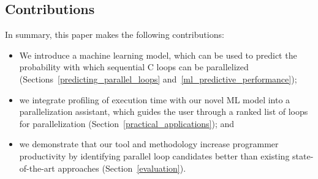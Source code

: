 \subsection{Contributions}

In summary, this paper makes the following contributions:
%
\begin{itemize}
\renewcommand\labelitemi{$\vartriangleright$}
\renewcommand\labelitemii{$\bullet$}
\item We introduce a machine learning model, which can be used to predict the probability with which sequential C loops can be parallelized (Sections~\ref{predicting_parallel_loops} and~\ref{ml_predictive_performance});
\item we integrate profiling of execution time with our novel ML model into a parallelization assistant, which guides the user through a ranked list of loops for parallelization (Section~\ref{practical_applications}); and
\item we demonstrate that our tool and methodology increase programmer productivity by identifying parallel loop candidates better than existing state-of-the-art approaches (Section~\ref{evaluation}).


\end{itemize}
